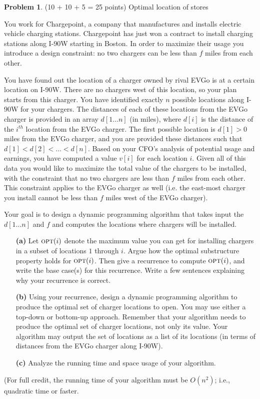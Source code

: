 \documentclass[11pt]{article}
\newcommand{\opt}{\mbox{\textsc{opt}}}
\theoremstyle{definition}
\theoremstyle{theorem}
\newtheorem{prob}{Problem}
\begin{document}
\begin{prob}
(10 + 10 + 5 = 25 points) Optimal location of stores
\end{prob}

You work for Chargepoint, a company that manufactures and installs electric vehicle charging stations. Chargepoint has just won a contract to install charging stations along I-90W starting in Boston. In order to maximize their usage you introduce a design constraint: no two chargers can be less than $f$ miles from each other. 

You have found out the location of a charger owned by rival EVGo is at a certain location on I-90W. There are no chargers west of this location, so your plan starts from this charger. You have identified exactly $n$ possible locations along I-90W for your chargers. The distances of each of these locations from the EVGo charger is provided in an array $d[1\ldots n]$ (in miles), where $d[i]$ is the distance of the $i^{th}$ location from the EVGo charger. The first possible location is $d[1]>0$ miles from the EVGo charger, and you are provided these distances such that $d[1]<d[2]<\ldots <d[n]$. Based on your CFO's analysis of potential usage and earnings, you have computed a value $v[i]$ for each location $i$. Given all of this data you would like to maximize the total value of the chargers to be installed, with the constraint that no two chargers are less than $f$ miles from each other. This constraint applies to the EVGo charger as well (i.e. the east-most charger you install cannot be less than $f$ miles west of the EVGo charger).

Your goal is to design a dynamic programming algorithm that takes
input the $d[1\ldots n]$ and $f$ and computes the locations where chargers will be installed.

\begin{itemize}
\item[{\bf (a)}] Let $\opt(i)$ denote the maximum value you can get
  for installing chargers in a subset of locations $1$ through $i$. Argue how the optimal substructure property holds for $\opt(i)$. Then give a recurrence to compute $\opt(i)$, and write the base case(s) for this recurrence.  Write a few sentences explaining why your recurrence is correct.

\item[{\bf (b)}] Using your recurrence, design a dynamic programming
  algorithm to produce the optimal set of charger locations to open.  You may use
  either a top-down or bottom-up approach.  Remember that your
  algorithm needs to produce the optimal set of charger locations, not only its
  value.  Your algorithm may output the set of locations as a list of its
  locations (in terms of distances from the EVGo charger along I-90W).

\item[{\bf (c)}]
  Analyze the running time and space usage of your algorithm.

\end{itemize}
(For full credit, the running time of your algorithm must be $O(n^2)$;
i.e., quadratic time or faster.  
\end{document}
